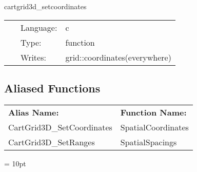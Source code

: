 \vspace{5mm}


\hspace{5mm} cartgrid3d\_setcoordinates 

\hspace{5mm}{\it set coordinates after regridding } 


\hspace{5mm}

 \begin{tabular*}{160mm}{cll} 
~ & Language:  & c \\ 
~ & Type:  & function \\ 
~ & Writes:  & grid::coordinates(everywhere) \\ 
\end{tabular*} 


\subsection*{Aliased Functions}

\hspace{5mm}

 \begin{tabular*}{160mm}{ll} 

{\bf Alias Name:} ~~~~~~~ & {\bf Function Name:} \\ 
CartGrid3D\_SetCoordinates & SpatialCoordinates \\ 
CartGrid3D\_SetRanges & SpatialSpacings \\ 
\end{tabular*} 



\vspace{5mm}\parskip = 10pt 
